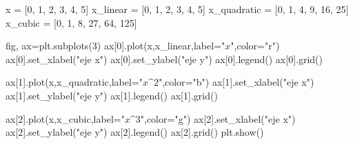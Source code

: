 \documentclass[
  letterpaper,
  DIV=11,
  numbers=noendperiod]{scrreprt}
\newenvironment{Shaded}{\begin{snugshade}}{\end{snugshade}}
\newcommand{\DecValTok}[1]{\textcolor[rgb]{0.68,0.00,0.00}{#1}}
\newcommand{\NormalTok}[1]{\textcolor[rgb]{0.00,0.23,0.31}{#1}}
\newcommand{\OperatorTok}[1]{\textcolor[rgb]{0.37,0.37,0.37}{#1}}
\newcommand{\StringTok}[1]{\textcolor[rgb]{0.13,0.47,0.30}{#1}}
\begin{document}
\begin{Shaded}
\begin{Highlighting}[]
\NormalTok{x }\OperatorTok{=}\NormalTok{ [}\DecValTok{0}\NormalTok{, }\DecValTok{1}\NormalTok{, }\DecValTok{2}\NormalTok{, }\DecValTok{3}\NormalTok{, }\DecValTok{4}\NormalTok{, }\DecValTok{5}\NormalTok{]}
\NormalTok{x\_linear }\OperatorTok{=}\NormalTok{ [}\DecValTok{0}\NormalTok{, }\DecValTok{1}\NormalTok{, }\DecValTok{2}\NormalTok{, }\DecValTok{3}\NormalTok{, }\DecValTok{4}\NormalTok{, }\DecValTok{5}\NormalTok{]}
\NormalTok{x\_quadratic }\OperatorTok{=}\NormalTok{ [}\DecValTok{0}\NormalTok{, }\DecValTok{1}\NormalTok{, }\DecValTok{4}\NormalTok{, }\DecValTok{9}\NormalTok{, }\DecValTok{16}\NormalTok{, }\DecValTok{25}\NormalTok{]}
\NormalTok{x\_cubic }\OperatorTok{=}\NormalTok{ [}\DecValTok{0}\NormalTok{, }\DecValTok{1}\NormalTok{, }\DecValTok{8}\NormalTok{, }\DecValTok{27}\NormalTok{, }\DecValTok{64}\NormalTok{, }\DecValTok{125}\NormalTok{]}

\NormalTok{fig, ax}\OperatorTok{=}\NormalTok{plt.subplots(}\DecValTok{3}\NormalTok{)}
\NormalTok{ax[}\DecValTok{0}\NormalTok{].plot(x,x\_linear,label}\OperatorTok{=}\StringTok{"$x$"}\NormalTok{,color}\OperatorTok{=}\StringTok{"r"}\NormalTok{)}
\NormalTok{ax[}\DecValTok{0}\NormalTok{].set\_xlabel(}\StringTok{"eje x"}\NormalTok{)}
\NormalTok{ax[}\DecValTok{0}\NormalTok{].set\_ylabel(}\StringTok{"eje y"}\NormalTok{)}
\NormalTok{ax[}\DecValTok{0}\NormalTok{].legend()}
\NormalTok{ax[}\DecValTok{0}\NormalTok{].grid()}


\NormalTok{ax[}\DecValTok{1}\NormalTok{].plot(x,x\_quadratic,label}\OperatorTok{=}\StringTok{"$x\^{}2$"}\NormalTok{,color}\OperatorTok{=}\StringTok{"b"}\NormalTok{)}
\NormalTok{ax[}\DecValTok{1}\NormalTok{].set\_xlabel(}\StringTok{"eje x"}\NormalTok{)}
\NormalTok{ax[}\DecValTok{1}\NormalTok{].set\_ylabel(}\StringTok{"eje y"}\NormalTok{)}
\NormalTok{ax[}\DecValTok{1}\NormalTok{].legend()}
\NormalTok{ax[}\DecValTok{1}\NormalTok{].grid()}


\NormalTok{ax[}\DecValTok{2}\NormalTok{].plot(x,x\_cubic,label}\OperatorTok{=}\StringTok{"$x\^{}3$"}\NormalTok{,color}\OperatorTok{=}\StringTok{"g"}\NormalTok{)}
\NormalTok{ax[}\DecValTok{2}\NormalTok{].set\_xlabel(}\StringTok{"eje x"}\NormalTok{)}
\NormalTok{ax[}\DecValTok{2}\NormalTok{].set\_ylabel(}\StringTok{"eje y"}\NormalTok{)}
\NormalTok{ax[}\DecValTok{2}\NormalTok{].legend()}
\NormalTok{ax[}\DecValTok{2}\NormalTok{].grid()}
\NormalTok{plt.show()}
\end{Highlighting}
\end{Shaded}
\end{document}
